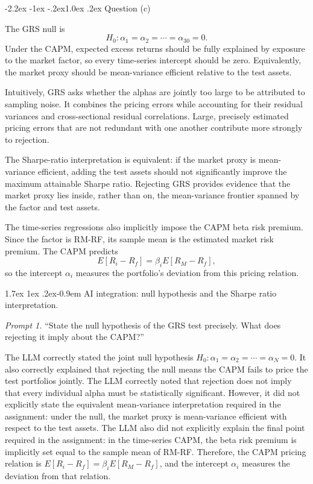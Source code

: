\documentclass[11pt]{article}
\makeatletter
\renewcommand\subsection{\@startsection{subsection}{2}{0pt}%
  {-2.2ex \@plus -1ex \@minus -.2ex}{1.0ex \@plus .2ex}%
  {\normalfont\bfseries\normalsize\color{psink}}}
\renewcommand\paragraph{\@startsection{paragraph}{4}{0pt}%
  {1.7ex \@plus 1ex \@minus .2ex}{-0.9em}%
  {\normalfont\bfseries\normalsize\color{psink}}}
\makeatother
\begin{document}
\subsection{Question (c)}

The GRS null is
\[
H_0:\alpha_1=\alpha_2=\cdots=\alpha_{30}=0.
\]
Under the CAPM, expected excess returns should be fully explained by
exposure to the market factor, so every time-series intercept should be
zero. Equivalently, the market proxy should be mean-variance efficient
relative to the test assets.

Intuitively, GRS asks whether the alphas are jointly too large to be
attributed to sampling noise. It combines the pricing errors while
accounting for their residual variances and cross-sectional residual
correlations. Large, precisely estimated pricing errors that are not
redundant with one another contribute more strongly to rejection.

The Sharpe-ratio interpretation is equivalent: if the market proxy is
mean-variance efficient, adding the test assets should not significantly
improve the maximum attainable Sharpe ratio. Rejecting GRS provides evidence
that the market proxy lies inside, rather than on, the mean-variance
frontier spanned by the factor and test assets.

The time-series regressions also implicitly impose the CAPM beta risk
premium. Since the factor is RM-RF, its sample mean is the estimated market
risk premium. The CAPM predicts
\[
E[R_i-R_f]=\beta_iE[R_M-R_f],
\]
so the intercept $\alpha_i$ measures the portfolio's deviation from this
pricing relation.

\paragraph{AI integration: null hypothesis and the Sharpe ratio
interpretation.}

\textit{Prompt 1.} ``State the null hypothesis of the GRS test precisely.
What does rejecting it imply about the CAPM?''

The LLM correctly stated the joint null hypothesis
$H_0:\alpha_1=\alpha_2=\cdots=\alpha_N=0$. It also correctly explained that
rejecting the null means the CAPM fails to price the test portfolios
jointly. The LLM correctly noted that rejection does not imply that every
individual alpha must be statistically significant. However, it did not
explicitly state the equivalent mean-variance interpretation required in the
assignment: under the null, the market proxy is mean-variance efficient with
respect to the test assets. The LLM also did not explicitly explain the
final point required in the assignment: in the time-series CAPM, the beta
risk premium is implicitly set equal to the sample mean of RM-RF.
Therefore, the CAPM pricing relation is
$E[R_i-R_f]=\beta_iE[R_M-R_f]$, and the intercept $\alpha_i$ measures the
deviation from that relation.
\end{document}
